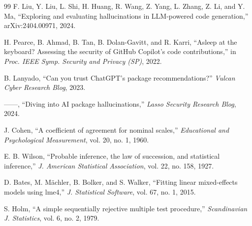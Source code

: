 \documentclass[conference]{IEEEtran}
\begin{document}
\begin{thebibliography}{99}
 F. Liu, Y. Liu, L. Shi, H. Huang, R. Wang, Z. Yang, L. Zhang, Z. Li, and Y. Ma, ``Exploring and evaluating hallucinations in LLM-powered code generation,'' arXiv:2404.00971, 2024.

 H. Pearce, B. Ahmad, B. Tan, B. Dolan-Gavitt, and R. Karri, ``Asleep at the keyboard? Assessing the security of GitHub Copilot's code contributions,'' in \emph{Proc. IEEE Symp. Security and Privacy (SP)}, 2022.

 B. Lanyado, ``Can you trust ChatGPT's package recommendations?'' \emph{Vulcan Cyber Research Blog}, 2023.

 ------, ``Diving into AI package hallucinations,'' \emph{Lasso Security Research Blog}, 2024.

 J. Cohen, ``A coefficient of agreement for nominal scales,'' \emph{Educational and Psychological Measurement}, vol. 20, no. 1, 1960.

 E. B. Wilson, ``Probable inference, the law of succession, and statistical inference,'' \emph{J. American Statistical Association}, vol. 22, no. 158, 1927.

 D. Bates, M. M\"{a}chler, B. Bolker, and S. Walker, ``Fitting linear mixed-effects models using lme4,'' \emph{J. Statistical Software}, vol. 67, no. 1, 2015.

 S. Holm, ``A simple sequentially rejective multiple test procedure,'' \emph{Scandinavian J. Statistics}, vol. 6, no. 2, 1979.

\end{thebibliography}
\end{document}
